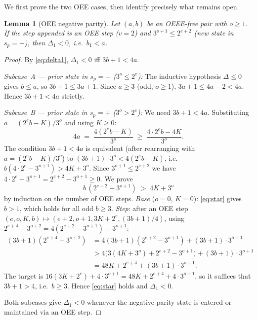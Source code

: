 \documentclass[11pt]{article}
\newtheorem{lemma}{Lemma}[section]
\begin{document}
We first prove the two OEE cases, then identify precisely what remains open.

\begin{lemma}[OEE negative parity]
\label{lem:neg}
Let $(a, b)$ be an OEEE-free pair with $o \geq 1$.  If the step appended
is an OEE step ($v = 2$) and $3^{o+1} \leq 2^{e+2}$ (new state in
$s_p = -$), then $\Delta_1 < 0$, i.e.\ $b_1 < a$.
\end{lemma}
\begin{proof}
By \eqref{eq:delta1}, $\Delta_1 < 0$ iff $3b + 1 < 4a$.

\textit{Subcase~A — prior state in $s_p = -$ ($3^o \leq 2^e$):}
The inductive hypothesis $\Delta \leq 0$ gives $b \leq a$, so
$3b + 1 \leq 3a + 1$.  Since $a \geq 3$ (odd, $o \geq 1$), $3a + 1 \leq
4a - 2 < 4a$.  Hence $3b + 1 < 4a$ strictly.

\textit{Subcase~B — prior state in $s_p = +$ ($3^o > 2^e$):}
We need $3b + 1 < 4a$.  Substituting $a = (2^e b - K)/3^o$ and using
$K \geq 0$:
\[
  4a \;=\; \frac{4(2^e b - K)}{3^o} \;\geq\; \frac{4 \cdot 2^e b - 4K}{3^o}.
\]
The condition $3b + 1 < 4a$ is equivalent (after rearranging with $a =
(2^e b - K)/3^o$) to $(3b+1) \cdot 3^o < 4(2^e b - K)$, i.e.\
$b(4 \cdot 2^e - 3^{o+1}) > 4K + 3^o$.  Since $3^{o+1} \leq 2^{e+2}$
we have $4 \cdot 2^e - 3^{o+1} = 2^{e+2} - 3^{o+1} \geq 0$.
We prove
\begin{equation}
  b\,(2^{e+2} - 3^{o+1}) \;>\; 4K + 3^o \label{eq:star}\tag{$*$}
\end{equation}
by induction on the number of OEE steps.  \emph{Base} ($o = 0$, $K = 0$):
\eqref{eq:star} gives $b > 1$, which holds for all odd $b \geq 3$.
\emph{Step}: after an OEE step $(e,o,K,b) \mapsto (e+2, o+1, 3K+2^e,
(3b+1)/4)$, using $2^{e+4} - 3^{o+2} = 4(2^{e+2}-3^{o+1}) + 3^{o+1}$:
\begin{align*}
  (3b+1)(2^{e+4} - 3^{o+2})
    &= 4(3b+1)(2^{e+2}-3^{o+1}) + (3b+1)\cdot 3^{o+1} \\
    &> 4\bigl(3(4K+3^o) + 2^{e+2} - 3^{o+1}\bigr) + (3b+1)\cdot 3^{o+1} \\
    &= 48K + 2^{e+4} + (3b+1)\cdot 3^{o+1}.
\end{align*}
The target is $16(3K+2^e) + 4\cdot 3^{o+1} = 48K + 2^{e+4} + 4\cdot
3^{o+1}$, so it suffices that $3b+1 > 4$, i.e.\ $b \geq 3$.  Hence
\eqref{eq:star} holds and $\Delta_1 < 0$.

Both subcases give $\Delta_1 < 0$ whenever the negative parity state is
entered or maintained via an OEE step.
\end{proof}
\end{document}
